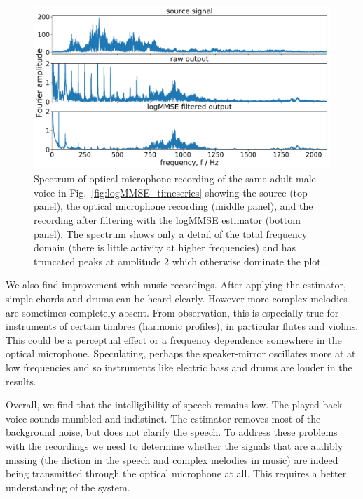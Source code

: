 \documentclass[paper-main.tex]{subfiles}
\begin{document}
\begin{figure}
	\includegraphics[width=\textwidth]{figures/combined_spectrum_melatos.pdf}
	\caption{Spectrum of optical microphone recording of the same adult male voice in Fig.~\ref{fig:logMMSE_timeseries} showing the source (top panel), the optical microphone recording (middle panel), and the recording after filtering with the logMMSE estimator (bottom panel). The spectrum shows only a detail of the total frequency domain (there is little activity at higher frequencies) and has truncated peaks at amplitude 2 which otherwise dominate the plot.}
	\label{fig:logMMSE_spectrum}
\end{figure}


We also find improvement with music recordings.
After applying the estimator, simple chords and drums can be heard clearly. 
However more complex melodies are sometimes completely absent. 
From observation, this is especially true for instruments of certain timbres (harmonic profiles), in particular flutes and violins.
This could be a perceptual effect or a frequency dependence somewhere in the optical microphone. 
Speculating, perhaps the speaker-mirror oscillates more at at low frequencies and so instruments like electric bass and drums are louder in the results.


Overall, we find that the intelligibility of speech remains low. 
The played-back voice sounds mumbled and indistinct. 
The estimator removes most of the background noise, but does not clarify the speech. 
To address these problems with the recordings we need to determine whether the signals that are audibly missing (the diction in the speech and complex melodies in music) are indeed being transmitted through the optical microphone at all. 
This requires a better understanding of the system.
\end{document}
